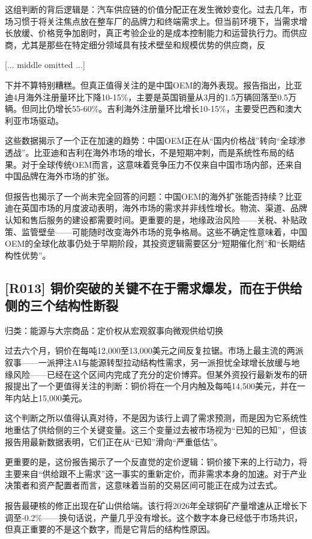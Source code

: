 \documentclass[11pt]{ctexart}
\begin{document}
这组判断的背后逻辑是：汽车供应链的价值分配正在发生微妙变化。过去几年，市场习惯于将关注焦点放在整车厂的品牌力和终端需求上。但当前环境下，当需求增长放缓、价格竞争加剧时，真正考验企业的是成本控制能力和运营执行力。而供应商，尤其是那些在特定细分领域具有技术壁垒和规模优势的供应商，反

[... middle omitted ...]

下并不算特别糟糕。但真正值得关注的是中国OEM的海外表现。报告指出，比亚迪4月海外注册量环比下降10-15\%，主要是英国销量从3月的1.5万辆回落至0.5万辆。但同比仍增长55-60\%。吉利海外注册量环比增长10-15\%，主要受巴西和澳大利亚市场驱动。

这些数据揭示了一个正在加速的趋势：中国OEM正在从“国内价格战”转向“全球渗透战”。比亚迪和吉利在海外市场的增长，不是短期冲刺，而是系统性布局的结果。对于全球传统OEM而言，这意味着竞争压力不仅来自中国市场内部，还来自中国品牌在海外市场的扩张。

但报告也揭示了一个尚未完全回答的问题：中国OEM的海外扩张能否持续？比亚迪在英国市场的月度波动表明，海外市场的需求并非线性增长。物流、渠道、品牌认知和售后服务的建设都需要时间。更重要的是，地缘政治风险——关税、补贴政策、监管壁垒——可能随时改变海外市场的竞争格局。这些不确定性意味着，中国OEM的全球化故事仍处于早期阶段，其投资逻辑需要区分“短期催化剂”和“长期结构性优势”。

\subsection{[R013] 铜价突破的关键不在于需求爆发，而在于供给侧的三个结构性断裂}
{\small\color{refgray}归类：能源与大宗商品：定价权从宏观叙事向微观供给切换}

过去六个月，铜价在每吨12,000至13,000美元之间反复拉锯。市场上最主流的两派叙事——一派押注AI与能源转型拉动结构性需求，另一派担忧全球增长放缓与地缘风险——已经在这个区间内完成了充分的定价博弈。但某外资投行最新发布的研报提出了一个更值得关注的判断：铜价将在一个月内触及每吨14,500美元，并在一年内站上15,000美元。

这个判断之所以值得认真对待，不是因为该行上调了需求预测，而是因为它系统性地重估了供给侧的三个关键变量。这三个变量过去被市场视为“已知的已知”，但该报告用最新数据表明，它们正在从“已知”滑向“严重低估”。

更重要的是，这份报告揭示了一个反直觉的定价逻辑：铜价接下来的上行动力，将主要来自“供给跟不上需求”这一事实的重新定价，而非需求本身的加速。对于产业决策者和资产配置者而言，这意味着当前的交易区间可能正在成为过去式。

报告最硬核的修正出现在矿山供给端。该行将2026年全球铜矿产量增速从正增长下调至-0.2\%——换句话说，产量几乎没有增长。这个数字本身已经低于市场共识，但真正重要的不是这个数字，而是它背后的结构性原因。
\end{document}
